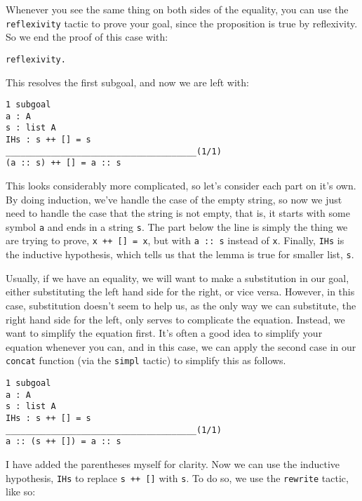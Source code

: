 Whenever you see the same thing on both sides of the equality, you can use the \texttt{reflexivity} tactic to prove your goal, since the proposition is true by reflexivity.
So we end the proof of this case with:

\begin{verbatim}
reflexivity.
\end{verbatim}

This resolves the first subgoal, and now we are left with:

\begin{verbatim}
1 subgoal
a : A
s : list A
IHs : s ++ [] = s
______________________________________(1/1)
(a :: s) ++ [] = a :: s
\end{verbatim}

This looks considerably more complicated, so let's consider each part on it's own.
By doing induction, we've handle the case of the empty string, so now we just need to handle the case that the string is not empty, that is, it starts with some symbol \texttt{a} and ends in a string \texttt{s}.
The part below the line is simply the thing we are trying to prove, \texttt{x ++ [] = x}, but with \texttt{a :: s} instead of \texttt{x}.
Finally, \texttt{IHs} is the inductive hypothesis, which tells us that the lemma is true for smaller list, \texttt{s}.

Usually, if we have an equality, we will want to make a substitution in our goal, either substituting the left hand side for the right, or vice versa.
However, in this case, substitution doesn't seem to help us, as the only way we can substitute, the right hand side for the left, only serves to complicate the equation.
Instead, we want to simplify the equation first.
It's often a good idea to simplify your equation whenever you can, and in this case, we can apply the second case in our \texttt{concat} function (via the \texttt{simpl} tactic) to simplify this as follows.

\begin{verbatim}
1 subgoal
a : A
s : list A
IHs : s ++ [] = s
______________________________________(1/1)
a :: (s ++ []) = a :: s
\end{verbatim}

I have added the parentheses myself for clarity.
Now we can use the inductive hypothesis, \texttt{IHs} to replace \texttt{s ++ []} with  \texttt{s}.
To do so, we use the \texttt{rewrite} tactic, like so:

